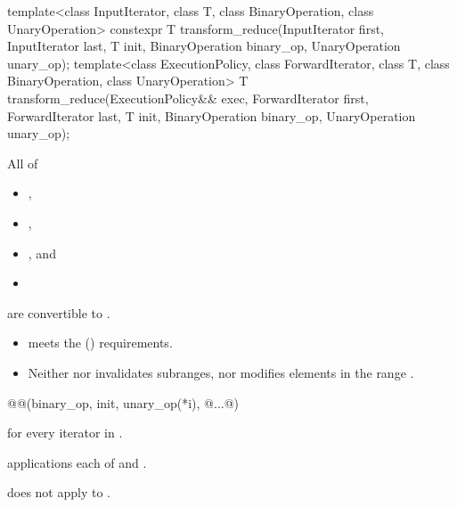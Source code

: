 %
\begin{itemdecl}
template<class InputIterator, class T,
         class BinaryOperation, class UnaryOperation>
  constexpr T transform_reduce(InputIterator first, InputIterator last, T init,
                               BinaryOperation binary_op, UnaryOperation unary_op);
template<class ExecutionPolicy,
         class ForwardIterator, class T,
         class BinaryOperation, class UnaryOperation>
  T transform_reduce(ExecutionPolicy&& exec,
                     ForwardIterator first, ForwardIterator last,
                     T init, BinaryOperation binary_op, UnaryOperation unary_op);
\end{itemdecl}

\begin{itemdescr}
\pnum
\mandates
  All of
  \begin{itemize}
  \item {},
  \item {},
  \item {}, and
  \item {}
  \end{itemize}
  are convertible to .

\pnum
\expects
\begin{itemize}
\item
   meets the  () requirements.
\item
  Neither  nor  invalidates subranges,
  nor modifies elements in the range .
\end{itemize}

\pnum
\returns
\begin{codeblock}
@@(binary_op, init, unary_op(*i), @$\dotsc$@)
\end{codeblock}
for every iterator  in .

\pnum
\complexity
{} applications each of  and
.

\pnum
\begin{note}
 does not apply  to .
\end{note}
\end{itemdescr}

